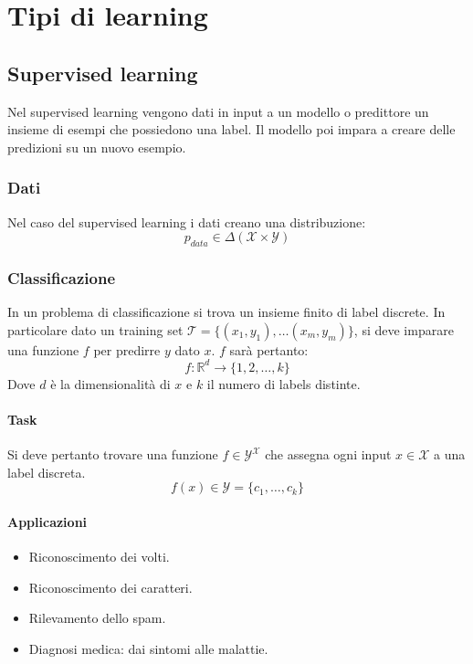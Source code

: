 \section{Tipi di learning}

\subsection{Supervised learning}
Nel supervised learning vengono dati in input a un modello o predittore un insieme di esempi che possiedono una label.
Il modello poi impara a creare delle predizioni su un nuovo esempio.

\subsubsection{Dati}
Nel caso del supervised learning i dati creano una distribuzione:
$$p_{data}\in\Delta(\mathcal{X}\times\mathcal{Y})$$

\subsubsection{Classificazione}
In un problema di classificazione si trova un insieme finito di label discrete.
In particolare dato un training set $\mathcal{T} = \{(x_1, y_1),\dots(x_m, y_m)\}$, si deve imparare una funzione $f$ per predirre $y$ dato $x$.
$f$ sar\`a pertanto:
$$f:\mathbb{R}^d \rightarrow\{1, 2, \dots, k\}$$
Dove $d$ \`e la dimensionalit\`a di $x$ e $k$ il numero di labels distinte.

\paragraph{Task}
Si deve pertanto trovare una funzione $f\in\mathcal{Y^X}$ che assegna ogni input $x\in\mathcal{X}$ a una label discreta.
$$f(x)\in\mathcal{Y}=\{c_1,\dots,c_k\}$$
\paragraph{Applicazioni}
\begin{multicols}{2}
	\begin{itemize}
		\item Riconoscimento dei volti.
		\item Riconoscimento dei caratteri.
		\item Rilevamento dello spam.
		\item Diagnosi medica: dai sintomi alle malattie.
	\end{itemize}
\end{multicols}

